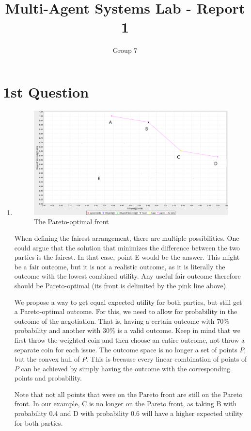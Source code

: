 \documentclass{article}
\title{Multi-Agent Systems Lab - Report 1}
\author{Group 7}
\begin{document}
\maketitle

\section{1st Question}

\begin{enumerate}[label=(\alph*)]
\item 
\begin{figure}[h]
\caption{The Pareto-optimal front}
\centering
\includegraphics[width=.75\textwidth]{imgs/graph_2}
\end{figure}

When defining the fairest arrangement, there are multiple possibilities. One could argue that the solution that minimizes the difference between the two parties is the fairest. In that case, point E would be the answer. This might be a fair outcome, but it is not a realistic outcome, as it is literally the outcome with the lowest combined utility. Any useful fair outcome therefore should be Pareto-optimal (its front is delimited by the pink line above).

We propose a way to get equal expected utility for both parties, but still get a Pareto-optimal outcome. For this, we need to allow for probability in the outcome of the negotiation. That is, having a certain outcome with 70\% probability and another with 30\% is a valid outcome. Keep in mind that we first throw the weighted coin and then choose an entire outcome, not throw a separate coin for each issue. The outcome space is no longer a set of points $P$, but the convex hull of $P$. This is because every linear combination of points of $P$ can be achieved by simply having the outcome with the corresponding points and probability.

Note that not all points that were on the Pareto front are still on the Pareto front. In our example, C is no longer on the Pareto front, as taking B with probability 0.4 and D with probability 0.6 will have a higher expected utility for both parties.


\end{enumerate}
\end{document}
